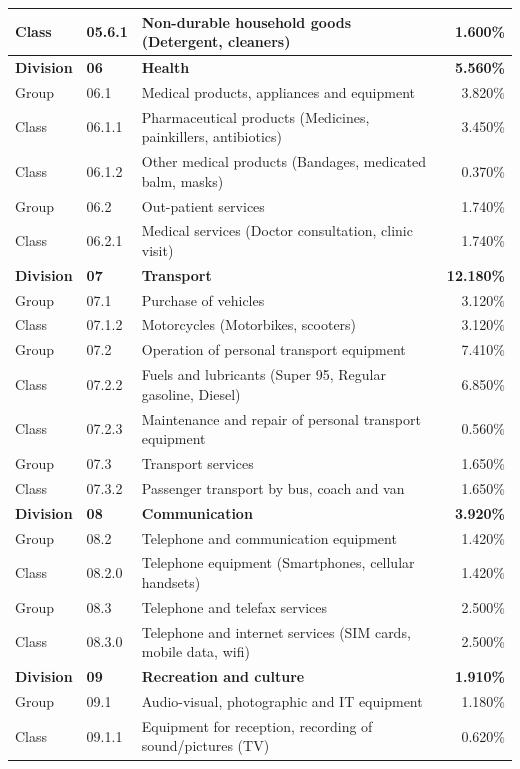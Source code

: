 \documentclass[11pt,a4paper,oneside]{article}
\begin{document}
\begin{longtable}{llp{7.5cm}r}
Class & 05.6.1 & Non-durable household goods (Detergent, cleaners) & 1.600\% \\
\midrule
\textbf{Division} & \textbf{06} & \textbf{Health} & \textbf{5.560\%} \\
Group & 06.1 & Medical products, appliances and equipment & 3.820\% \\
Class & 06.1.1 & Pharmaceutical products (Medicines, painkillers, antibiotics) & 3.450\% \\
Class & 06.1.2 & Other medical products (Bandages, medicated balm, masks) & 0.370\% \\
Group & 06.2 & Out-patient services & 1.740\% \\
Class & 06.2.1 & Medical services (Doctor consultation, clinic visit) & 1.740\% \\
\midrule
\textbf{Division} & \textbf{07} & \textbf{Transport} & \textbf{12.180\%} \\
Group & 07.1 & Purchase of vehicles & 3.120\% \\
Class & 07.1.2 & Motorcycles (Motorbikes, scooters) & 3.120\% \\
Group & 07.2 & Operation of personal transport equipment & 7.410\% \\
Class & 07.2.2 & Fuels and lubricants (Super 95, Regular gasoline, Diesel) & 6.850\% \\
Class & 07.2.3 & Maintenance and repair of personal transport equipment & 0.560\% \\
Group & 07.3 & Transport services & 1.650\% \\
Class & 07.3.2 & Passenger transport by bus, coach and van & 1.650\% \\
\midrule
\textbf{Division} & \textbf{08} & \textbf{Communication} & \textbf{3.920\%} \\
Group & 08.2 & Telephone and communication equipment & 1.420\% \\
Class & 08.2.0 & Telephone equipment (Smartphones, cellular handsets) & 1.420\% \\
Group & 08.3 & Telephone and telefax services & 2.500\% \\
Class & 08.3.0 & Telephone and internet services (SIM cards, mobile data, wifi) & 2.500\% \\
\midrule
\textbf{Division} & \textbf{09} & \textbf{Recreation and culture} & \textbf{1.910\%} \\
Group & 09.1 & Audio-visual, photographic and IT equipment & 1.180\% \\
Class & 09.1.1 & Equipment for reception, recording of sound/pictures (TV) & 0.620\% \\

\end{longtable}
\end{document}
